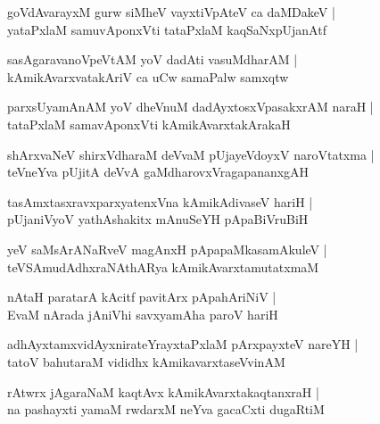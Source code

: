\documentclass[twoside,12pt,openright]{book}
\newcounter{shloka}[chapter]
\begin{document}
\begin{shloka}%
goVdAvarayxM gurw siMheV vayxtiVpAteV ca daMDakeV |\\
yataPxlaM samuvAponxVti tataPxlaM kaqSaNxpUjanAtf 
\end{shloka}

\begin{shloka}%
sasAgaravanoVpeVtAM yoV dadAti vasuMdharAM |\\
kAmikAvarxvatakAriV ca uCw samaPalw samxqtw
\end{shloka}

\begin{shloka}%
parxsUyamAnAM yoV dheVnuM dadAyxtosxVpasakxrAM naraH |\\
tataPxlaM samavAponxVti kAmikAvarxtakArakaH
\end{shloka}

\begin{shloka}%
shArxvaNeV shirxVdharaM deVvaM pUjayeVdoyxV naroVtatxma |\\
teVneYva pUjitA deVvA gaMdharovxVragapananxgAH
\end{shloka}

\begin{shloka}%
tasAmxtasxravxparxyatenxVna kAmikAdivaseV hariH |\\
pUjaniVyoV yathAshakitx mAnuSeYH pApaBiVruBiH 
\end{shloka}

\begin{shloka}%
yeV saMsArANaRveV magAnxH pApapaMkasamAkuleV |\\
teVSAmudAdhxraNAthARya kAmikAvarxtamutatxmaM
\end{shloka}

\begin{shloka}%
nAtaH paratarA kAcitf pavitArx pApahAriNiV |\\
EvaM nArada jAniVhi savxyamAha paroV hariH 
\end{shloka}

\begin{shloka}%
adhAyxtamxvidAyxnirateYrayxtaPxlaM pArxpayxteV nareYH |\\
tatoV bahutaraM vididhx kAmikavarxtaseVvinAM 
\end{shloka}

\begin{shloka}%
rAtwrx jAgaraNaM kaqtAvx kAmikAvarxtakaqtanxraH |\\
na pashayxti yamaM rwdarxM neYva gacaCxti dugaRtiM 
\end{shloka}
\end{document}
